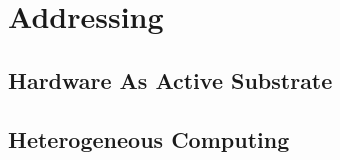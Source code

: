 \section{Addressing}

\subsection{Hardware As Active Substrate}

\subsection{Heterogeneous Computing}

